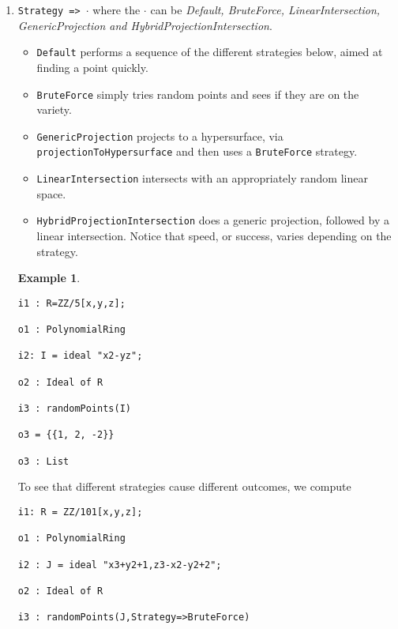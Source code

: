 \documentclass[11pt]{amsart}
\theoremstyle{definition}
\newtheorem{example}{Example}[section]
\begin{document}
\begin{enumerate}
	\vspace{1em}
	
\item {\tt Strategy => $\cdot$} where the $\cdot$ can be \textit{Default, BruteForce, LinearIntersection, GenericProjection and  HybridProjectionIntersection}.

\begin{itemize}
    \item {\tt Default} performs a sequence of the different strategies below, aimed at finding a point quickly.    
	\item {\tt BruteForce} simply tries random points and sees if they are on the variety.
	
	\item {\tt GenericProjection} projects to a hypersurface, via 
	{\tt projectionToHypersurface} and then uses a {\tt BruteForce} strategy.
	
	\item {\tt LinearIntersection} intersects with an appropriately random linear space.
	
	\item {\tt HybridProjectionIntersection} does a generic projection, followed by a linear intersection. Notice that speed, or success, varies depending on the strategy.
		
\end{itemize}

\begin{example}\label{BruteForce}
	{{\small\color{blue}
	\begin{verbatim}
i1 : R=ZZ/5[x,y,z];

o1 : PolynomialRing

i2: I = ideal "x2-yz";

o2 : Ideal of R

i3 : randomPoints(I)

o3 = {{1, 2, -2}}

o3 : List
\end{verbatim}
}}

To see that different strategies cause different outcomes, we compute
	{{\small\color{blue}
	\begin{verbatim}
i1: R = ZZ/101[x,y,z];

o1 : PolynomialRing

i2 : J = ideal "x3+y2+1,z3-x2-y2+2";

o2 : Ideal of R

i3 : randomPoints(J,Strategy=>BruteForce)


\end{verbatim}}}
\end{example}
\end{enumerate}
\end{document}
